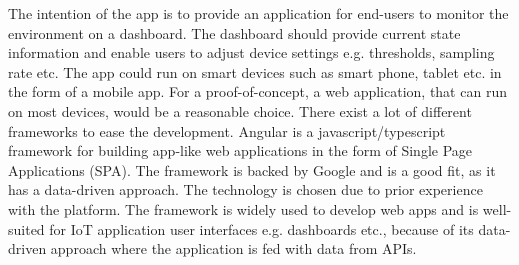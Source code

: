 The intention of the app is to provide an application for end-users to monitor the environment on a dashboard. The dashboard should provide current state information and enable users to adjust device settings e.g. thresholds, sampling rate etc. The app could run on smart devices such as smart phone, tablet etc. in the form of a mobile app. For a proof-of-concept, a web application, that can run on most devices, would be a reasonable choice. There exist a lot of different frameworks to ease the development.  Angular \cite{angular} is a javascript/typescript framework for building app-like web applications in the form of Single Page Applications (SPA). The framework is backed by Google and is a good fit, as it has a data-driven approach. The technology is chosen due to prior experience with the platform. The framework is widely used to develop web apps and is well-suited for IoT application user interfaces e.g. dashboards etc., because of its data-driven approach where the application is fed with data from APIs.